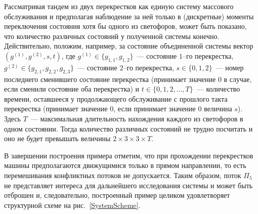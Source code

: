 Рассматривая тандем из двух перекрестков как единую систему массового обслуживания и предполагая наблюдение за ней только в (дискретные) моменты переключения состояния хотя бы одного из светофоров,  может быть показано,  что количество различных состояний у полученной системы конечно. Действительно,  положим,  например,  за состояние объединенной системы вектор $(g^{(1)},  g^{(2)},  s,  t)$,  где $g^{(1)}\in \{g_{1,  1},  g_{1,  2}\}$~--- состояние $1$--го перекрестка,  $g^{(2)}\in \{g_{2,  1},  g_{2,  2},  g_{2,  3}\}$~--- состояние $2$--го перекрестка,  $s \in \{0,  1,  2\}$~--- номер последнего сменившего состояние перекрестка (принимает значение $0$ в случае,  если сменили состояние оба перекрестка) и $t \in \{0,  1,  2,  \ldots,  T\}$~--- количество времени,  оставшееся у продолжающего обслуживание с прошлого такта перекрестка (принимает значение $0$,  если принимает значение $0$ величина $s$). Здесь $T$~--- максимальная длительность нахождения каждого из светофоров в одном состоянии. Тогда количество различных состояний не трудно посчитать и оно не будет превышать величины  $2\times 3 \times 3 \times T$.

В завершении построения примера отметим,  что при прохождении перекрестков машины предполагаются движущимися только в прямом направлении,  то есть перемешивания конфликтных потоков не допускается. Таким образом,  поток $\Pi_5$ не представляет интереса для дальнейшего исследования системы и может быть отброшен и,  следовательно,  построенный пример целиком удовлетворяет структурной схеме на рис.~\ref{SystemScheme}.

